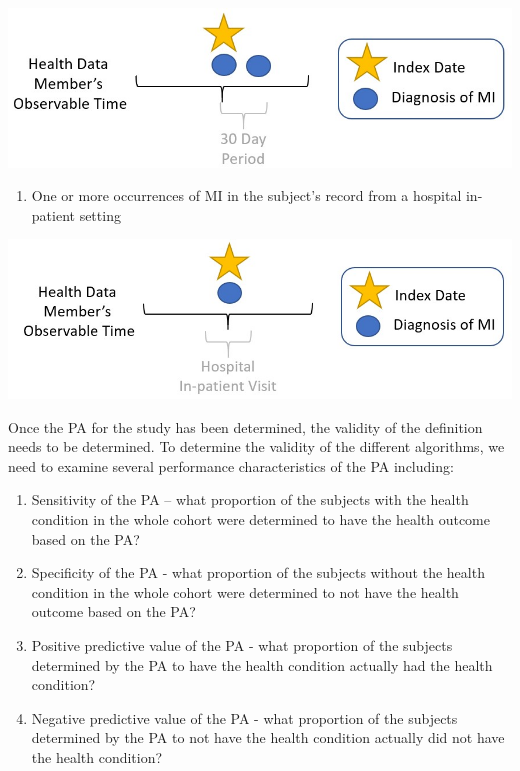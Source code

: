 \documentclass[11pt]{book}
\providecommand{\tightlist}{%
  \setlength{\itemsep}{0pt}\setlength{\parskip}{0pt}}
\theoremstyle{definition}
\theoremstyle{definition}
\theoremstyle{definition}
\theoremstyle{remark}
\begin{document}
\begin{center}\includegraphics[width=0.75\linewidth]{images/ClinicalValidity/figure3} \end{center}

\begin{enumerate}
\def\labelenumi{\arabic{enumi})}
\setcounter{enumi}{2}
\tightlist
\item
  One or more occurrences of MI in the subject's record from a hospital in-patient setting
\end{enumerate}

\begin{center}\includegraphics[width=0.75\linewidth]{images/ClinicalValidity/figure4} \end{center}

Once the PA for the study has been determined, the validity of the definition needs to be determined. To determine the validity of the different algorithms, we need to examine several performance characteristics of the PA including:

\begin{enumerate}
\def\labelenumi{\arabic{enumi})}
\item
  Sensitivity of the PA -- what proportion of the subjects with the health condition in the whole cohort were determined to have the health outcome based on the PA?
\item
  Specificity of the PA - what proportion of the subjects without the health condition in the whole cohort were determined to not have the health outcome based on the PA?
\item
  Positive predictive value of the PA - what proportion of the subjects determined by the PA to have the health condition actually had the health condition?
\item
  Negative predictive value of the PA - what proportion of the subjects determined by the PA to not have the health condition actually did not have the health condition?
\end{enumerate}
\end{document}
